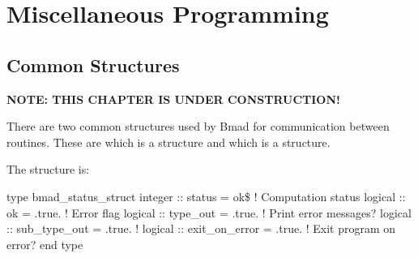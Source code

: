 \chapter{Miscellaneous Programming}

\section{Common Structures}
\label{s:common.struct}


{\bf NOTE: THIS CHAPTER IS UNDER CONSTRUCTION!}

There are two common structures used by Bmad for communication between
routines. These are  which is a 
structure and  which is a 
structure.


The  structure is:
\begin{example}
type bmad_status_struct
  integer :: status         = ok\$     ! Computation status 
  logical :: ok             = .true.   ! Error flag
  logical :: type_out       = .true.   ! Print error messages?
  logical :: sub_type_out   = .true.   ! 
  logical :: exit_on_error  = .true.   ! Exit program on error?
end type
\end{example}




